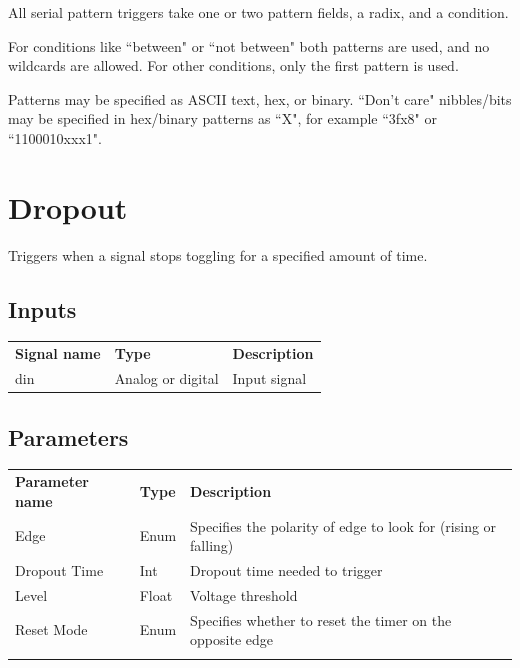 All serial pattern triggers take one or two pattern fields, a radix, and a condition.

For conditions like ``between" or ``not between" both patterns are used, and no wildcards are allowed. For other
conditions, only the first pattern is used.

Patterns may be specified as ASCII text, hex, or binary. ``Don't care" nibbles/bits may be specified in hex/binary
patterns as ``X", for example ``3fx8" or ``1100010xxx1".

\pagebreak

\section{Dropout}

Triggers when a signal stops toggling for a specified amount of time.

\subsection{Inputs}

\begin{tabularx}{16cm}{llX}
\thickhline
\textbf{Signal name} & \textbf{Type} & \textbf{Description} \\
\thickhline
din & Analog or digital & Input signal \\
\end{tabularx}

\subsection{Parameters}

\begin{tabularx}{16cm}{llX}
\thickhline
\textbf{Parameter name} & \textbf{Type} & \textbf{Description} \\
\thickhline
Edge & Enum & Specifies the polarity of edge to look for (rising or falling) \\
\thinhline
Dropout Time & Int & Dropout time needed to trigger \\
\thinhline
Level & Float & Voltage threshold\\
\thinhline
Reset Mode & Enum & Specifies whether to reset the timer on the opposite edge \\
\thickhline
\end{tabularx}


